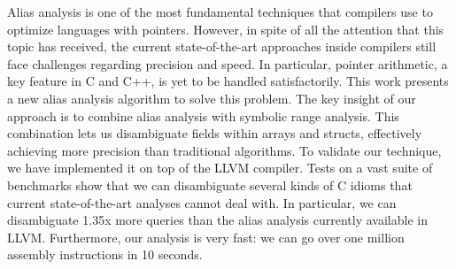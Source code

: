 Alias analysis is one of the most fundamental techniques that
compilers use to optimize languages with pointers.
However, in spite of all the attention that this topic has received, the current
state-of-the-art approaches inside compilers still face challenges regarding
precision and speed.
In particular, pointer arithmetic, a key feature in C and C++, is yet to be
handled satisfactorily.
This work presents a new alias analysis algorithm to solve this problem.
The key insight of our approach is to combine alias analysis with symbolic
range analysis.
This combination lets us disambiguate fields within arrays and structs,
effectively achieving more precision than traditional algorithms.
To validate our technique, we have implemented it on top of the LLVM compiler.
Tests on a vast suite of benchmarks show that we can disambiguate several
kinds of C idioms that current state-of-the-art analyses cannot deal with.
In particular, we can disambiguate 1.35x more queries than the alias analysis
currently available in LLVM.
Furthermore, our analysis is very fast: we can go over one million assembly
instructions in 10 seconds.

